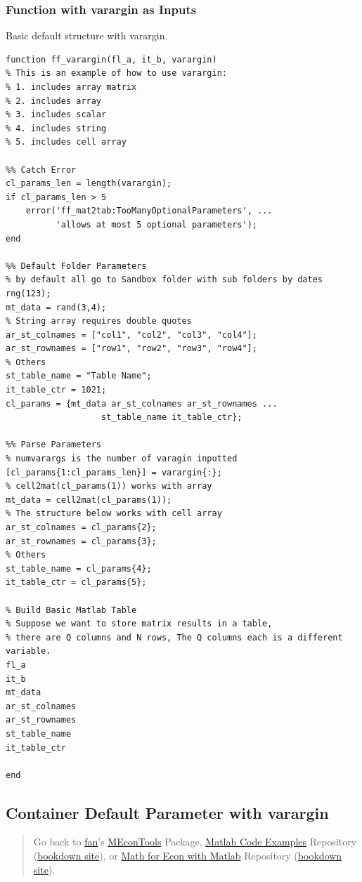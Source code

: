 \documentclass[
]{book}
\begin{document}
\hypertarget{function-with-varargin-as-inputs}{%
\subsubsection{Function with varargin as Inputs}\label{function-with-varargin-as-inputs}}

Basic default structure with varargin.

\begin{verbatim}
function ff_varargin(fl_a, it_b, varargin)
% This is an example of how to use varargin:
% 1. includes array matrix
% 2. includes array
% 3. includes scalar
% 4. includes string
% 5. includes cell array

%% Catch Error
cl_params_len = length(varargin);
if cl_params_len > 5
    error('ff_mat2tab:TooManyOptionalParameters', ...
          'allows at most 5 optional parameters');
end

%% Default Folder Parameters
% by default all go to Sandbox folder with sub folders by dates
rng(123);
mt_data = rand(3,4);
% String array requires double quotes
ar_st_colnames = ["col1", "col2", "col3", "col4"];
ar_st_rownames = ["row1", "row2", "row3", "row4"];
% Others
st_table_name = "Table Name";
it_table_ctr = 1021;
cl_params = {mt_data ar_st_colnames ar_st_rownames ...
                   st_table_name it_table_ctr};

%% Parse Parameters
% numvarargs is the number of varagin inputted
[cl_params{1:cl_params_len}] = varargin{:};
% cell2mat(cl_params(1)) works with array
mt_data = cell2mat(cl_params(1));
% The structure below works with cell array
ar_st_colnames = cl_params{2};
ar_st_rownames = cl_params{3};
% Others
st_table_name = cl_params{4};
it_table_ctr = cl_params{5};

% Build Basic Matlab Table
% Suppose we want to store matrix results in a table,
% there are Q columns and N rows, The Q columns each is a different variable.
fl_a
it_b
mt_data
ar_st_colnames
ar_st_rownames
st_table_name
it_table_ctr

end
\end{verbatim}

\hypertarget{container-default-parameter-with-varargin}{%
\subsection{Container Default Parameter with varargin}\label{container-default-parameter-with-varargin}}

\begin{quote}
Go back to \href{http://fanwangecon.github.io/}{fan}'s \href{https://fanwangecon.github.io/MEconTools/}{MEconTools} Package, \href{https://fanwangecon.github.io/M4Econ/}{Matlab Code Examples} Repository (\href{https://fanwangecon.github.io/M4Econ/bookdown}{bookdown site}), or \href{https://fanwangecon.github.io/Math4Econ/}{Math for Econ with Matlab} Repository (\href{https://fanwangecon.github.io/Math4Econ/bookdown}{bookdown site}).
\end{quote}
\end{document}
